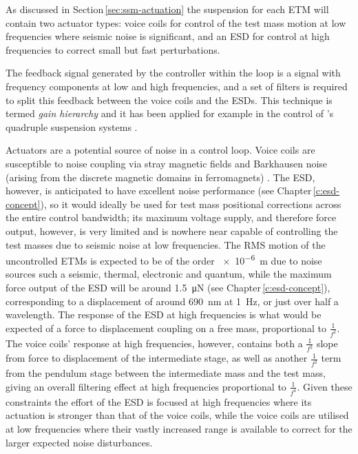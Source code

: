 As discussed in Section\,\ref{sec:ssm-actuation} the suspension for each \gls{ETM} will contain two actuator types: voice coils for control of the test mass motion at low frequencies where seismic noise is significant, and an \gls{ESD} for control at high frequencies to correct small but fast perturbations.

The feedback signal generated by the controller within the loop is a signal with frequency components at low and high frequencies, and a set of filters is required to split this feedback between the voice coils and the \glspl{ESD}. This technique is termed \emph{gain hierarchy} and it has been applied for example in the control of \ALIGO{}'s quadruple suspension systems \cite{Shapiro2012}.

Actuators are a potential source of noise in a control loop. Voice coils are susceptible to noise coupling via stray magnetic fields and Barkhausen noise (arising from the discrete magnetic domains in ferromagnets) \cite{Weiss2008}. The \gls{ESD}, however, is anticipated to have excellent noise performance (see Chapter\,\ref{c:esd-concept}), so it would ideally be used for test mass positional corrections across the entire control bandwidth; its maximum voltage supply, and therefore force output, however, is very limited and is nowhere near capable of controlling the test masses due to seismic noise at low frequencies. The \gls{RMS} motion of the uncontrolled \glspl{ETM} is expected to be of the order \SI{e-6}{\meter} due to noise sources such a seismic, thermal, electronic and quantum, while the maximum force output of the \gls{ESD} will be around \SI{1.5}{\micro\newton} (see Chapter\,\ref{c:esd-concept}), corresponding to a displacement of around \SI{690}{\nano\meter} at \SI{1}{\hertz}, or just over half a wavelength. The response of the \gls{ESD} at high frequencies is what would be expected of a force to displacement coupling on a free mass, proportional to $\frac{1}{f^2}$. The voice coils' response at high frequencies, however, contains both a $\frac{1}{f^2}$ slope from force to displacement of the intermediate stage, as well as another $\frac{1}{f^2}$ term from the pendulum stage between the intermediate mass and the test mass, giving an overall filtering effect at high frequencies proportional to $\frac{1}{f^4}$. Given these constraints the effort of the \gls{ESD} is focused at high frequencies where its actuation is stronger than that of the voice coils, while the voice coils are utilised at low frequencies where their vastly increased range is available to correct for the larger expected noise disturbances.

